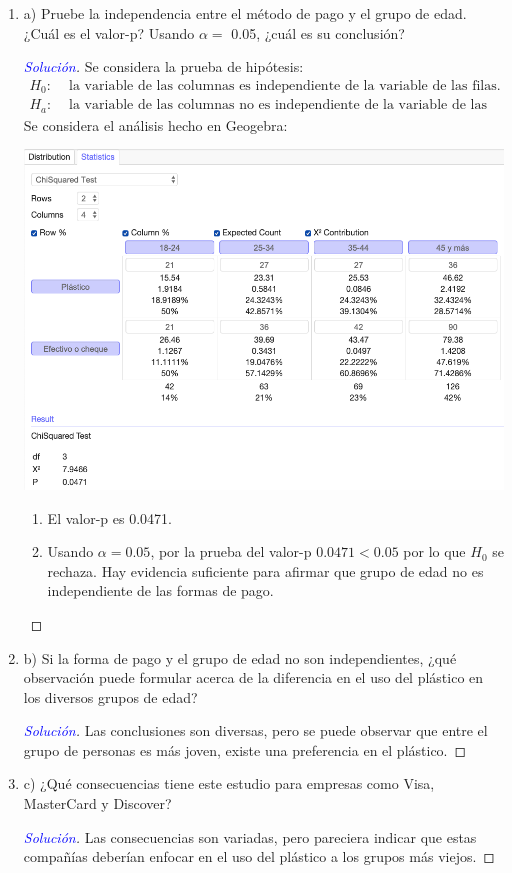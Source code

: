 \documentclass[a4paper,12pt]{article}
\newenvironment{solution}
  {\renewcommand\qedsymbol{$\square$}\begin{proof}[\textcolor{blue}{Solución}]}
  {\end{proof}}
\begin{document}
\begin{enumerate}
    \item a) Pruebe la independencia entre el método de pago y el grupo de edad. ¿Cuál es el valor-p? Usando $\alpha=$ 0.05, ¿cuál es su conclusión?
\begin{solution} Se considera la prueba de hipótesis: 
\begin{align*}
    H_0: & \text{ la variable de las columnas es independiente de la variable de las filas.}\\ 
    H_a: & \text{  la variable de las columnas no es independiente de la variable de las filas.}
\end{align*}
Se considera el análisis hecho en Geogebra:
\begin{center}
    \includegraphics[scale=0.4]{images/Screen Shot 2021-05-10 at 23.40.36.png}
\end{center}

\begin{enumerate}
    \item El valor-p es 0.0471.
    \item Usando $\alpha=0.05$, por la prueba del valor-p $0.0471<0.05$ por lo que $H_0$ se rechaza. Hay evidencia suficiente para afirmar que grupo de edad no es independiente de las formas de pago. 
\end{enumerate}
\end{solution}
    \item b) Si la forma de pago y el grupo de edad no son independientes, ¿qué observación puede formular acerca de la diferencia en el uso del plástico en los diversos grupos de edad?
    \begin{solution}
    Las conclusiones son diversas, pero se puede observar que entre el grupo de personas es más joven, existe una preferencia en el plástico.
    \end{solution}
    \item c) ¿Qué consecuencias tiene este estudio para empresas como Visa, MasterCard y Discover?
    \begin{solution}
    Las consecuencias son variadas, pero pareciera indicar que estas compañías deberían enfocar en el uso del plástico a los grupos más viejos. 
    \end{solution}
\end{enumerate}
\end{document}
